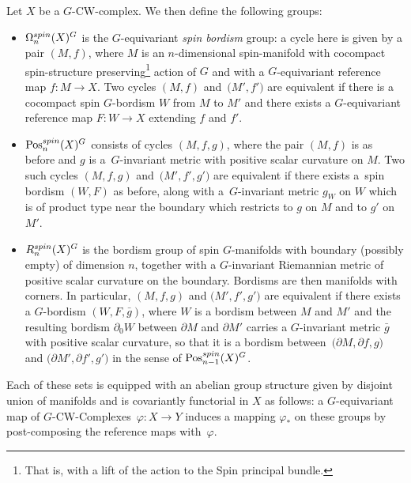 \documentclass[11pt]{article}
\numberwithin{equation}{section}
\numberwithin{equation}{section}
\begin{document}
\begin{Definition}\label{def:Stolz_groups}
		Let $X$ be a $G$-CW-complex. We then define the following groups:		
		\begin{itemize}\itemsep=0pt
			\item $\Omega^{\rm spin}_{n}(X)^{G}$ is the $G$-equivariant \textit{spin
				bordism} group: a cycle here is given by a pair $(M,f)$, where $M$ is an
			$n$-dimensional spin-manifold with cocompact spin-structure
			preserving\footnote{That is, with a lift of the action to the Spin principal
				bundle.} action of $G$ and with a $G$-equivariant
			reference map $f\colon M\to X$. Two cycles $(M,f)$ and~$\bigl(M',f'\bigr)$ are
			equivalent if there is a cocompact spin $G$-bordism $W$ from $M$ to $M'$
			and there exists a $G$-equivariant reference map $F\colon W\to X$
			extending $f$ and $f'$.
			\item $\mathrm{Pos}^{\rm spin}_{n}(X)^{G}$ consists of cycles $(M,f,g)$, where the pair
			$(M,f)$ is as before and $g$ is a~$G$-invariant metric with positive
			scalar curvature on $M$. Two such cycles $(M,f,g)$ and~$\bigl(M',f',g'\bigr)$ are
			equivalent if there exists a~spin bordism $(W,F)$ as before, along with a~$G$-invariant metric $g_W$ on $W$ which is of product type near the
			boundary which restricts to $g$ on $M$ and to $g'$ on $M'$.
			\item $R^{\rm spin}_{n}(X)^{G}$ is the bordism group of spin $G$-manifolds with
			boundary (possibly empty) of dimension $n$, together with a $G$-invariant
			Riemannian metric of positive scalar curvature on the boundary. Bordisms are then manifolds with
			corners. In particular, $(M,f,g)$ and $\bigl(M',f',g'\bigr)$ are equivalent if there
			exists a $G$-bordism $(W,F,\bar{g})$, where $W$ is a bordism between $M$
			and $M'$ and the resulting bordism $\partial_0 W$ between $\partial M$ and
			$\partial M'$ carries a $G$-invariant
			metric $\bar{g}$ with positive scalar curvature, so that it is a
			bordism between~${\bigl(\partial M,\partial f,g\bigr)}$ and
			$\bigl(\partial M',\partial f',g'\bigr)$ in the sense of $\mathrm{Pos}^{\rm spin}_{n-1}(X)^{G}$.
		\end{itemize}
		
		Each of these sets is equipped with an abelian group structure given by
		disjoint union of manifolds and is covariantly functorial in $X$ as follows: a $G$-equivariant map of $G$-CW-Complexes~${\varphi\colon X \rightarrow Y}$ induces a mapping $\varphi_{*}$ on these groups
		by post-composing the reference maps with~$\varphi$.
	\end{Definition}
	
\end{document}
